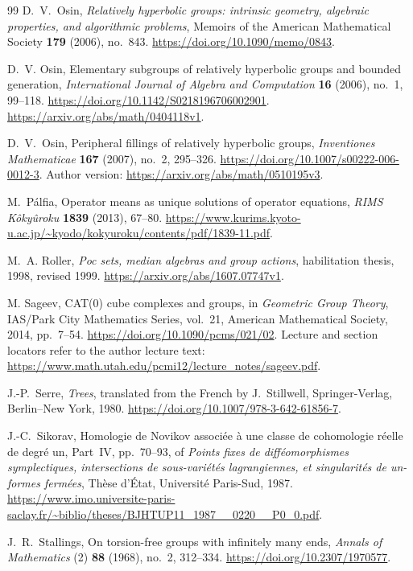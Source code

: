 \begin{thebibliography}{99}
D.~V.~Osin,
\emph{Relatively hyperbolic groups: intrinsic geometry, algebraic properties, and algorithmic problems},
Memoirs of the American Mathematical Society \textbf{179} (2006), no.~843.
\url{https://doi.org/10.1090/memo/0843}.

D.~V. Osin,
Elementary subgroups of relatively hyperbolic groups and bounded generation,
\emph{International Journal of Algebra and Computation}
\textbf{16} (2006), no.~1, 99--118.
\url{https://doi.org/10.1142/S0218196706002901}.
\url{https://arxiv.org/abs/math/0404118v1}.

D.~V.~Osin,
Peripheral fillings of relatively hyperbolic groups,
\emph{Inventiones Mathematicae} \textbf{167} (2007), no.~2, 295--326.
\url{https://doi.org/10.1007/s00222-006-0012-3}.
Author version: \url{https://arxiv.org/abs/math/0510195v3}.

M.~P\'alfia,
Operator means as unique solutions of operator equations,
\emph{RIMS K\^oky\^uroku} \textbf{1839} (2013), 67--80.
\url{https://www.kurims.kyoto-u.ac.jp/~kyodo/kokyuroku/contents/pdf/1839-11.pdf}.

M.~A. Roller,
\emph{Poc sets, median algebras and group actions},
habilitation thesis, 1998, revised 1999.
\url{https://arxiv.org/abs/1607.07747v1}.

M. Sageev,
CAT(0) cube complexes and groups,
in \emph{Geometric Group Theory}, IAS/Park City Mathematics Series,
vol.~21, American Mathematical Society, 2014, pp.~7--54.
\url{https://doi.org/10.1090/pcms/021/02}.
Lecture and section locators refer to the author lecture text:
\url{https://www.math.utah.edu/pcmi12/lecture_notes/sageev.pdf}.

J.-P.~Serre,
\emph{Trees},
translated from the French by J.~Stillwell,
Springer-Verlag, Berlin--New York, 1980.
\url{https://doi.org/10.1007/978-3-642-61856-7}.

J.-C.~Sikorav,
Homologie de Novikov associ\'ee \`a une classe de cohomologie r\'eelle de degr\'e un,
Part~IV, pp.~70--93, of
\emph{Points fixes de diff\'eomorphismes symplectiques, intersections de sous-vari\'et\'es lagrangiennes, et singularit\'es de un-formes ferm\'ees},
Th\`ese d'\'Etat, Universit\'e Paris-Sud, 1987.
\url{https://www.imo.universite-paris-saclay.fr/~biblio/theses/BJHTUP11_1987__0220__P0_0.pdf}.

J.~R.~Stallings,
On torsion-free groups with infinitely many ends,
\emph{Annals of Mathematics} (2) \textbf{88} (1968), no.~2, 312--334.
\url{https://doi.org/10.2307/1970577}.


\end{thebibliography}
